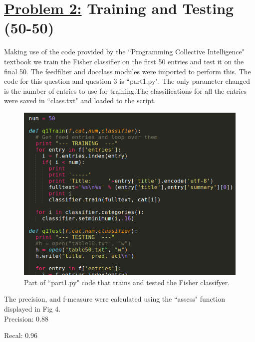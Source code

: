 \documentclass{article}
\begin{document}
\section*{{\underline{\huge {Problem 2:}} Training and Testing (50-50)  }}
Making use of the code provided by the ``Programming Collective Intelligence" textbook we train the Fisher classifier on the first 50 entries and test it on the final 50. The feedfilter and docclass modules were imported to perform this. The code for this question and question 3 is ``part1.py". The only parameter changed is the number of entries to use for training.The classifications for all the entries were saved in ``class.txt" and loaded to the script.

\begin{figure} [H]
 \centering
 \includegraphics[height = 10 cm]{p1.png}
 \caption{Part of ``part1.py" code that trains and tested the Fisher classifyer.}
\end{figure}

The precision, and f-measure were calculated using the ``assess" function displayed in Fig 4.\\

Precision: 0.88

Recal: 0.96
\end{document}
